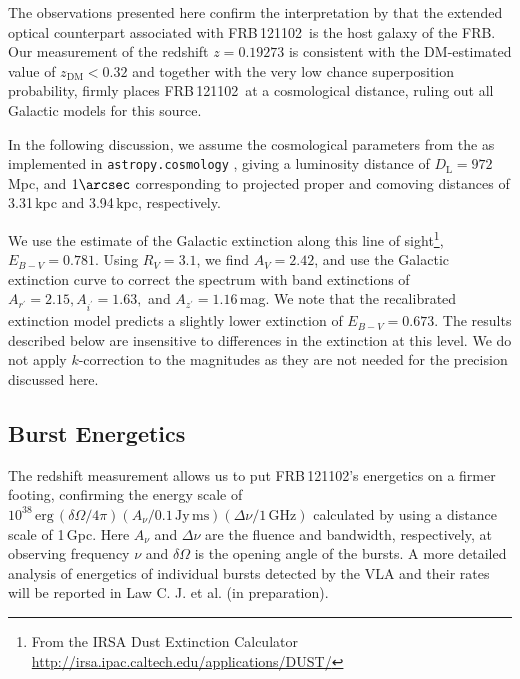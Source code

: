 \documentclass[twocolumn]{aastex61}
\def \frb {FRB\,121102}
\begin{document}
The observations presented here confirm the interpretation by \citet{clw+16} that the extended optical counterpart associated with \frb\ is the host galaxy of the FRB. Our measurement of the redshift $z=0.19273$ is consistent with the DM-estimated value of $z_\mathrm{DM}<0.32$ \citep{clw+16} and together with the very low chance superposition probability, firmly places \frb\ at a cosmological distance, ruling out all Galactic models for this source. 


In the following discussion, we assume the cosmological parameters from the \citet{aaa+16} as implemented in \texttt{astropy.cosmology} \citep{astropy2013}, giving a luminosity distance of $D_\mathrm{L}=972$\,Mpc, and $1\arcsec$ corresponding to projected proper and comoving distances of 3.31\,kpc and 3.94\,kpc, respectively. 

We use the \citet{sfd98} estimate of the Galactic extinction along this line of sight\footnote{From the IRSA Dust Extinction Calculator \url{http://irsa.ipac.caltech.edu/applications/DUST/}}, $E_{B-V}=0.781$. Using $R_V=3.1$, we find $A_V=2.42$, and use the \citet{ccm89} Galactic extinction curve to correct the spectrum with band extinctions of $A_{r^\prime} = 2.15, A_{i^\prime} = 1.63,$ and $A_{z^\prime} = 1.16$\,mag. We note that the \citet{sfs10, sf11} recalibrated extinction model predicts a slightly lower extinction of  $E_{B-V}=0.673$. The results described below are insensitive to differences in the extinction at this level.  We do not apply $k$-correction to the magnitudes as they are not needed for the precision discussed here.

\subsection{Burst Energetics}
The redshift measurement allows us to put \frb's energetics on a firmer footing, confirming the energy scale of $10^{38}\,\mathrm{erg}\,(\delta\Omega/4\pi)(A_\nu/\mathrm{0.1\,Jy\,ms})(\Delta\nu/\mathrm{1\,GHz})$ calculated by \citet{clw+16} using a distance scale of 1\,Gpc. Here $A_\nu$ and $\Delta\nu$ are the fluence and bandwidth, respectively, at observing frequency $\nu$ and $\delta\Omega$ is the opening angle of the bursts. A more detailed analysis of energetics of individual bursts detected by the VLA and their rates will be reported in Law C. J. et al. (in preparation).
\end{document}
